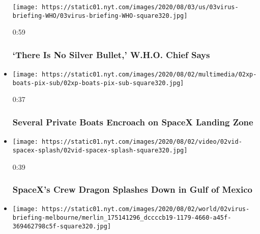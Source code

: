 \begin{itemize}
  \texttt{[image: https://static01.nyt.com/images/2020/08/03/us/03virus-briefing-WHO/03virus-briefing-WHO-square320.jpg]}

  0:59

  \hypertarget{there-is-no-silver-bullet-who-chief-says}{%
  \subsubsection{`There Is No Silver Bullet,' W.H.O. Chief
  Says}\label{there-is-no-silver-bullet-who-chief-says}}
\item
  \href{https://www.nytimes.com/video/us/100000007269193/boats-circle-spacex-capsule.html?action=click\&module=video-series-bar\&region=header\&pgtype=Article\&playlistId=video/latest-video}{}

  \texttt{[image: https://static01.nyt.com/images/2020/08/02/multimedia/02xp-boats-pix-sub/02xp-boats-pix-sub-square320.jpg]}

  0:37

  \hypertarget{several-private-boats-encroach-on-spacex-landing-zone}{%
  \subsubsection{Several Private Boats Encroach on SpaceX Landing
  Zone}\label{several-private-boats-encroach-on-spacex-landing-zone}}
\item
  \href{https://www.nytimes.com/video/us/100000007269118/spacex-splash-down.html?action=click\&module=video-series-bar\&region=header\&pgtype=Article\&playlistId=video/latest-video}{}

  \texttt{[image: https://static01.nyt.com/images/2020/08/02/video/02vid-spacex-splash/02vid-spacex-splash-square320.jpg]}

  0:39

  \hypertarget{spacexs-crew-dragon-splashes-down-in-gulf-of-mexico}{%
  \subsubsection{SpaceX's Crew Dragon Splashes Down in Gulf of
  Mexico}\label{spacexs-crew-dragon-splashes-down-in-gulf-of-mexico}}
\item
  \href{https://www.nytimes.com/video/world/australia/100000007269116/coronavirus-restrictions-melbourne.html?action=click\&module=video-series-bar\&region=header\&pgtype=Article\&playlistId=video/latest-video}{}

  \texttt{[image: https://static01.nyt.com/images/2020/08/02/world/02virus-briefing-melbourne/merlin\_175141296\_dccccb19-1179-4660-a45f-369462798c5f-square320.jpg]}


\end{itemize}
